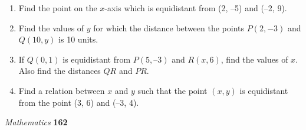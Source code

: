 \documentclass[a4paper,12pt]{article}
\begin{document}
\begin{enumerate}
    \item Find the point on the $x$-axis which is equidistant from (2, –5) and (–2, 9).

    \item Find the values of $y$ for which the distance between the points $P(2, -3)$ and $Q(10, y)$ is 10 units.

    \item If $Q(0, 1)$ is equidistant from $P(5, –3)$ and $R(x, 6)$, find the values of $x$. Also find the distances $QR$ and $PR$.

    \item Find a relation between $x$ and $y$ such that the point $(x, y)$ is equidistant from the point (3, 6) and (–3, 4).
\end{enumerate}

\vfill
\hfill \textit{Mathematics} \hfill \textbf{162}
\end{document}
